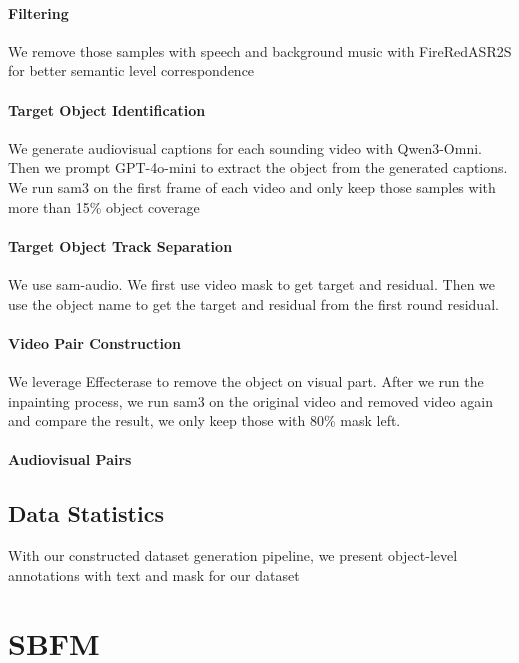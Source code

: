 \documentclass{article}
\begin{document}
\paragraph{Filtering}
We remove those samples with speech and background music with FireRedASR2S\citep{xu2026fireredasr2sstateoftheartindustrialgradeallinone}
for better semantic level correspondence


\paragraph{Target Object Identification}
We generate audiovisual captions for each sounding video with Qwen3-Omni\citep{xu2025qwen3omnitechnicalreport}. Then we prompt GPT-4o-mini to extract the object from the generated captions\citep{openai2024gpt4technicalreport}. We run sam3\citep{carion2025sam3segmentconcepts} on the first frame of each video and only keep those samples with more than 15\% object coverage

\paragraph{Target Object Track Separation}

We use sam-audio\citep{shi2025samaudiosegmentaudio}. We first use video mask to get target and residual. Then we use the object name to get the target and residual from the first round residual. 

\paragraph{Video Pair Construction}
We leverage Effecterase\citep{fu2026effecterasejointvideoobject} to remove the object on visual part. After we run the inpainting process, we run sam3 on the original video and removed video again and compare the result, we only keep those with 80\% mask left. 

\paragraph{Audiovisual Pairs}


\subsection{Data Statistics}
With our constructed dataset generation pipeline, we present object-level annotations with text and mask for our dataset

\section{SBFM}
\end{document}
